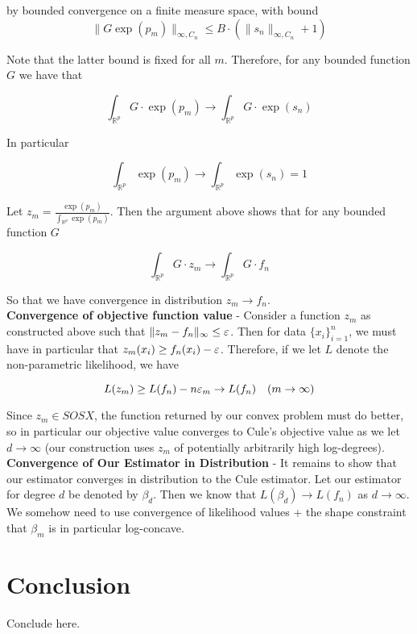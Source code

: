 \documentclass[11pt,reqno]{amsart}
\numberwithin{equation}{section}
\newcommand{\mr}{\mathbb{R}}
\newcommand{\tb}{\textbf}
\newcommand{\be}{\beta}
\begin{document}
by bounded convergence on a finite measure space, with bound \\

\[
\|G \exp(p_m) \|_{\infty, C_n} \leq B \cdot (\|s_n\|_{\infty, C_n} + 1) 
\]

 Note that the latter bound is fixed for all $m$. Therefore, for any bounded function $G$ we have that 

\[
\int_{\mr^p} G\cdot \exp(p_m) \to \int_{\mr^p} G \cdot \exp(s_n) 
\]

In particular 

\[
\int_{\mr^p} \exp(p_m) \to \int_{\mr^p} \exp(s_n ) = 1
\]

Let $z_m = \frac{\exp(p_m)}{\int_{\mr^p} \exp(p_m)} $. Then the argument above shows that for any bounded function $G$

\[
\int_{\mr^p} G\cdot z_m \to \int_{\mr^p} G \cdot f_n
\]

So that we have convergence in distribution $z_m \to f_n$. \\

\tb{Convergence of objective function value} - Consider a function $z_m$ as constructed above such that $\|z_m - f_n\|_{\infty} \leq \varepsilon$. Then for data $\{x_i\}_{i = 1}^n$, we must have in particular that $z_m(x_i) \geq f_n(x_i) - \varepsilon$. Therefore, if we let $L$ denote the non-parametric likelihood, we have 

\[
L(z_m) \geq L(f_n) - n \varepsilon_m \rightarrow L(f_n) \quad (m \rightarrow \infty) 
\]

Since $z_m \in SOSX$, the function returned by our convex problem must do better, so in particular our objective value converges to Cule's objective value as we let $d \to \infty$ (our construction uses $z_m$ of potentially arbitrarily high log-degrees). \\

\tb{Convergence of Our Estimator in Distribution} - It remains to show that our estimator converges in distribution to the Cule estimator. Let our estimator for degree $d$ be denoted by $\be_d$. Then we know that $L(\be_d) \to L(f_n)$ as $d \to \infty$. We somehow need to use convergence of likelihood values + the shape constraint that $\beta_m$ is in particular log-concave. \\

\section{Conclusion} Conclude here. 
\end{document}
